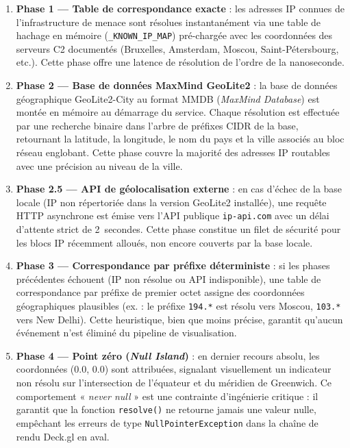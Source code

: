 \begin{enumerate}
    \item \textbf{Phase 1 --- Table de correspondance exacte} : les adresses IP connues de l'infrastructure de menace sont résolues instantanément via une table de hachage en mémoire (\texttt{\_KNOWN\_IP\_MAP}) pré-chargée avec les coordonnées des serveurs C2 documentés (Bruxelles, Amsterdam, Moscou, Saint-Pétersbourg, etc.). Cette phase offre une latence de résolution de l'ordre de la nanoseconde.
    \item \textbf{Phase 2 --- Base de données MaxMind GeoLite2} : la base de données géographique GeoLite2-City au format MMDB (\textit{MaxMind Database}) est montée en mémoire au démarrage du service. Chaque résolution est effectuée par une recherche binaire dans l'arbre de préfixes CIDR de la base, retournant la latitude, la longitude, le nom du pays et la ville associés au bloc réseau englobant. Cette phase couvre la majorité des adresses IP routables avec une précision au niveau de la ville.
    \item \textbf{Phase 2.5 --- API de géolocalisation externe} : en cas d'échec de la base locale (IP non répertoriée dans la version GeoLite2 installée), une requête HTTP asynchrone est émise vers l'API publique \texttt{ip-api.com} avec un délai d'attente strict de 2~secondes. Cette phase constitue un filet de sécurité pour les blocs IP récemment alloués, non encore couverts par la base locale.
    \item \textbf{Phase 3 --- Correspondance par préfixe déterministe} : si les phases précédentes échouent (IP non résolue ou API indisponible), une table de correspondance par préfixe de premier octet assigne des coordonnées géographiques plausibles (ex. : le préfixe \texttt{194.*} est résolu vers Moscou, \texttt{103.*} vers New Delhi). Cette heuristique, bien que moins précise, garantit qu'aucun événement n'est éliminé du pipeline de visualisation.
    \item \textbf{Phase 4 --- Point zéro (\textit{Null Island})} : en dernier recours absolu, les coordonnées (0.0, 0.0) sont attribuées, signalant visuellement un indicateur non résolu sur l'intersection de l'équateur et du méridien de Greenwich. Ce comportement « \textit{never null} » est une contrainte d'ingénierie critique : il garantit que la fonction \texttt{resolve()} ne retourne jamais une valeur nulle, empêchant les erreurs de type \texttt{NullPointerException} dans la chaîne de rendu Deck.gl en aval.
\end{enumerate}

